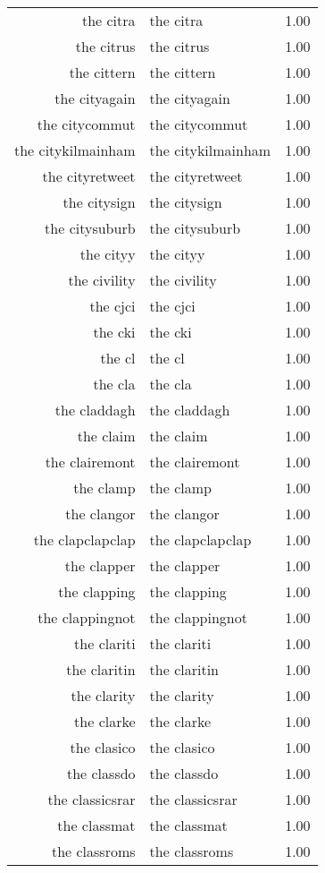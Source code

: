 \begin{table}[ht]
\begin{tabular}{rlr}
  the citra & the citra & 1.00 \\ 
  the citrus & the citrus & 1.00 \\ 
  the cittern & the cittern & 1.00 \\ 
  the cityagain & the cityagain & 1.00 \\ 
  the citycommut & the citycommut & 1.00 \\ 
  the citykilmainham & the citykilmainham & 1.00 \\ 
  the cityretweet & the cityretweet & 1.00 \\ 
  the citysign & the citysign & 1.00 \\ 
  the citysuburb & the citysuburb & 1.00 \\ 
  the cityy & the cityy & 1.00 \\ 
  the civility & the civility & 1.00 \\ 
  the cjci & the cjci & 1.00 \\ 
  the cki & the cki & 1.00 \\ 
  the cl & the cl & 1.00 \\ 
  the cla & the cla & 1.00 \\ 
  the claddagh & the claddagh & 1.00 \\ 
  the claim & the claim & 1.00 \\ 
  the clairemont & the clairemont & 1.00 \\ 
  the clamp & the clamp & 1.00 \\ 
  the clangor & the clangor & 1.00 \\ 
  the clapclapclap & the clapclapclap & 1.00 \\ 
  the clapper & the clapper & 1.00 \\ 
  the clapping & the clapping & 1.00 \\ 
  the clappingnot & the clappingnot & 1.00 \\ 
  the clariti & the clariti & 1.00 \\ 
  the claritin & the claritin & 1.00 \\ 
  the clarity & the clarity & 1.00 \\ 
  the clarke & the clarke & 1.00 \\ 
  the clasico & the clasico & 1.00 \\ 
  the classdo & the classdo & 1.00 \\ 
  the classicsrar & the classicsrar & 1.00 \\ 
  the classmat & the classmat & 1.00 \\ 
  the classroms & the classroms & 1.00 \\ 

\end{tabular}
\end{table}
